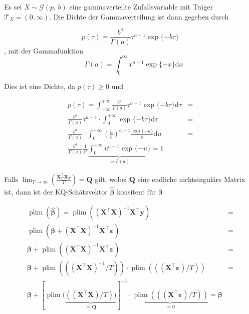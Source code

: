 Es sei $X\sim \mathcal{G}(p,\, b)$ eine gammaverteilte Zufallsvariable mit Träger $\mathcal T_X =(0, \infty)$. Die Dichte der Gammaverteilung ist dann gegeben durch
%

\begin{equation*} p(\tau) = \frac{b^a}{\Gamma(a)}\tau^{a-1}\operatorname{exp}\{-b\tau\}
\end{equation*}, mit der Gammafunktion
\begin{equation*} \quad\Gamma(a)= \int_{0}^{\infty}x^{a-1}\operatorname{exp}\{-x\}\mathrm dx
\end{equation*}

Dies ist eine Dichte, da $p(\tau) \geq 0$ und

\begin{eqnarray*}p(\tau) = \int_{-\infty}^{+\infty}\frac{b^a}{\Gamma(a)}\tau^{a-1}\operatorname{exp}\{-b\tau\}\mathrm d\tau &= \\ \frac{b^a}{\Gamma(a)}\tau^{a-1} \cdot \int_{0}^{+\infty}\operatorname{exp}\{-b\tau\}\mathrm d\tau &= \\ \frac{b^a}{\Gamma(a)} \cdot \int_{0}^{+\infty}\left(\frac{u}{b}\right)^{a-1}\frac{\operatorname{exp}\{-u\}}{b}\mathrm{d} u &= \\ \frac{b^a}{\Gamma(a)} \frac{1}{b^a} \underbrace{\int_{0}^{+\infty} u^{a-1}\operatorname{exp}\{-u\}}_{=\Gamma(a)}=1
\end{eqnarray*}

Falls $\lim_{T \to \infty}\left(\frac{\mathbf{X}_T^{\top} \mathbf{X}_T}{T}\right)=\mathbf{Q}$ gilt, wobei $\mathbf{Q}$ eine endliche nichtsinguläre Matrix ist, dann ist der KQ-Schätzvektor $\hat {\boldsymbol \beta}$ konsitent für $\boldsymbol \beta$\cite[S. 267]{judge1982introduction}

%
\begin{eqnarray*}\operatorname{plim}(\hat {\boldsymbol \beta} ) = \operatorname{plim}\left( \left(\mathbf{X}^\top \mathbf X \right)^{-1}\mathbf {X}^\top \mathbf y\right) &=\\ \operatorname{plim}\left( \boldsymbol \beta+\left(\mathbf{X}^\top \mathbf X \right)^{-1}\mathbf {X}^\top \boldsymbol \varepsilon \right)
	&=\\ \boldsymbol\beta+\operatorname{plim}\left(\left(\mathbf{X}^\top \mathbf X \right)^{-1}\mathbf {X}^\top \boldsymbol \varepsilon \right)
	&=\\ \boldsymbol \beta+\operatorname{plim}\left(\left(\left(\mathbf{X}^\top \mathbf X \right)^{-1}/T \right)\right) \cdot \operatorname{plim}\left(\left(\left(\mathbf{X}^\top \boldsymbol \varepsilon \right)/T \right)\right)
	&=\\ \boldsymbol \beta+[\operatorname{plim}( \underbrace{((\mathbf{X}^\top \mathbf{X} )/T) )}_{=\mathbf{Q}} ]^{-1} \cdot \underbrace{\operatorname{plim}\left(\left(\left(\mathbf{X}^\top \boldsymbol \varepsilon \right)/T\right)\right)}_{=0}= \boldsymbol \beta
\end{eqnarray*}
%
\newpage
